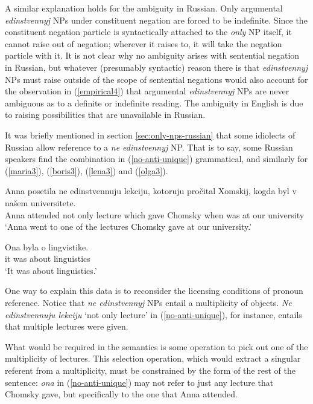 A similar explanation holds for the ambiguity in Russian. Only argumental \textit{edinstvennyj} NPs under constituent negation are forced to be indefinite. Since the constituent negation particle is syntactically attached to the \textit{only} NP itself, it cannot raise out of negation; wherever it raises to, it will take the negation particle with it. It is not clear why no ambiguity arises with sentential negation in Russian, but whatever (presumably syntactic) reason there is that \textit{edinstvennyj} NPs must raise outside of the scope of sentential negations would also account for the observation in (\ref{empirical4}) that argumental \textit{edinstvennyj} NPs are never ambiguous as to a definite or indefinite reading. The ambiguity in English is due to raising possibilities that are unavailable in Russian.

It was briefly mentioned in section \ref{sec:only-nps-russian} that some idiolects of Russian allow reference to a \textit{ne edinstvennyj} NP. That is to say, some Russian speakers find the combination in (\ref{no-anti-unique}) grammatical, and similarly for (\ref{maria3}), (\ref{boris3}), (\ref{lena3}) and (\ref{olga3}).

\begin{exe}
	\ex \label{no-anti-unique} \begin{xlist}
		\ex \gll Anna posetila ne edinstvennuju lekciju, kotoruju pro\v{c}ital Xomskij, kogda byl v na\v{s}em universitete.\\
		Anna attended not only lecture which gave Chomsky when was at our university\\
		\glt `Anna went to one of the lectures Chomsky gave at our university.'
		
		\ex \gll Ona byla o lingvistike.\\
		it was about linguistics\\
		\glt `It was about linguistics.'
	\end{xlist}
\end{exe}

One way to explain this data is to reconsider the licensing conditions of pronoun reference. Notice that \textit{ne edinstvennyj} NPs entail a multiplicity of objects. \textit{Ne edinstvennuju lekciju} `not only lecture' in (\ref{no-anti-unique}), for instance, entails that multiple lectures were given.

What would be required in the semantics is some operation to pick out one of the multiplicity of lectures. This selection operation, which would extract a singular referent from a multiplicity, must be constrained by the form of the rest of the sentence: \textit{ona} in (\ref{no-anti-unique}) may not refer to just any lecture that Chomsky gave, but specifically to the one that Anna attended.

